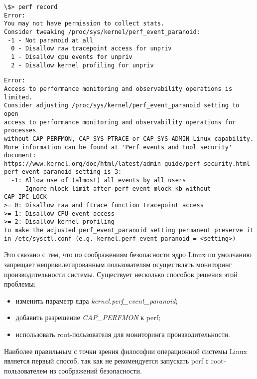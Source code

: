 \noindent\begin{minipage}{\linewidth}
\begin{lstlisting}[style=CodeListing, label=sec_tech:code:perf_err1, caption={Первый вариант ошибки, встречающейся после установки утилиты}]
\$> perf record
Error:
You may not have permission to collect stats.
Consider tweaking /proc/sys/kernel/perf_event_paranoid:
 -1 - Not paranoid at all
  0 - Disallow raw tracepoint access for unpriv
  1 - Disallow cpu events for unpriv
  2 - Disallow kernel profiling for unpriv
\end{lstlisting}
\vspace{-1em}
\begin{lstlisting}[style=CodeListing, label=sec_tech:code:perf_err2, caption={Второй вариант ошибки, встречающейся после установки утилиты}]
Error:
Access to performance monitoring and observability operations is limited.
Consider adjusting /proc/sys/kernel/perf_event_paranoid setting to open
access to performance monitoring and observability operations for processes
without CAP_PERFMON, CAP_SYS_PTRACE or CAP_SYS_ADMIN Linux capability.
More information can be found at 'Perf events and tool security' document:
https://www.kernel.org/doc/html/latest/admin-guide/perf-security.html
perf_event_paranoid setting is 3:
  -1: Allow use of (almost) all events by all users
      Ignore mlock limit after perf_event_mlock_kb without CAP_IPC_LOCK
>= 0: Disallow raw and ftrace function tracepoint access
>= 1: Disallow CPU event access
>= 2: Disallow kernel profiling
To make the adjusted perf_event_paranoid setting permanent preserve it
in /etc/sysctl.conf (e.g. kernel.perf_event_paranoid = <setting>)
\end{lstlisting}
\end{minipage}

Это связано с тем, что по соображениям безопасности ядро Linux по умолчанию запрещает непривилегированным пользователям 
осуществлять мониторинг производительности системы. Существует несколько способов решения этой проблемы:

\begin{itemize}
    \item изменить параметр ядра \textit{kernel.perf\_event\_paranoid};
    \item добавить разрешение \textit{CAP\_PERFMON} к perf;
    \item использовать root-пользователя для мониторинга производительности.
\end{itemize}

Наиболее правильным с точки зрения философии операционной системы Linux является первый способ, 
так как не рекомендуется запускать perf с root-пользователем из соображений безопасности.

